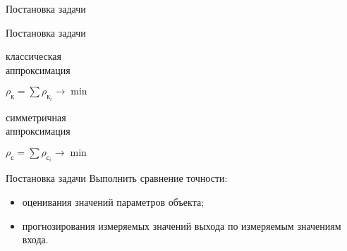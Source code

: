 \documentclass[hyperref={pdftex,unicode}]{beamer}
\begin{document}
\begin{frame}
  \maketitle
\end{frame}

\begin{frame}{Постановка задачи}
  \centering

\end{frame}

\begin{frame}{Постановка задачи}
  \begin{minipage}[h]{0.45\linewidth}
    \centering классическая \\ аппроксимация

    

    \( \rho_{\text{к}} = \sum \rho_{\text{к}_i} \rightarrow \min \)
  \end{minipage}
  \hfill
  \begin{minipage}[h]{0.45\linewidth}
    \centering симметричная \\ аппроксимация

    

    \bigskip
    \( \rho_{\text{с}} = \sum \rho_{\text{с}_i} \rightarrow \min \)
  \end{minipage}
\end{frame}

\begin{frame}{Постановка задачи}
  Выполнить сравнение точности:
  \begin{itemize}
  \item оценивания значений параметров объекта;
  \item прогнозирования измеряемых значений выхода по измеряемым значениям входа.
  \end{itemize}
\end{frame}
\end{document}

